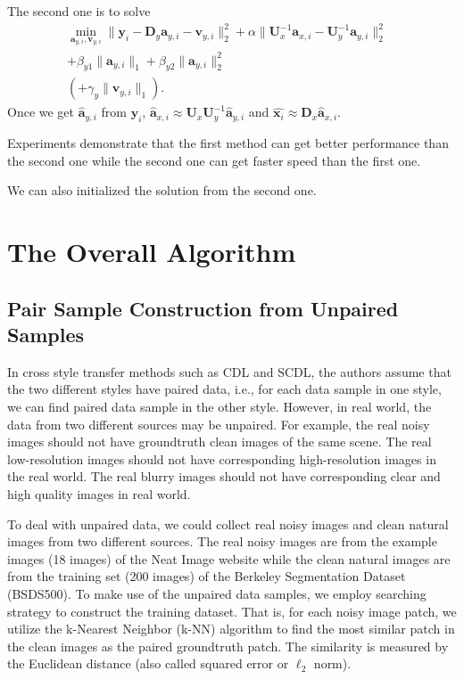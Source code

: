 \documentclass[10pt,twocolumn,letterpaper]{article}
\begin{document}
The second one is to solve
\begin{equation}
\begin{split}
\min_{\bm{a}_{y,i},\bm{v}_{y,i}}
\|\bm{y}_{i}-\bm{D}_{y}\bm{a}_{y,i}-\bm{v}_{y,i}\|_{2}^{2}
+
\alpha
\|\bm{U}_{x}^{-1}\bm{a}_{x,i}-\bm{U}_{y}^{-1}\bm{a}_{y,i}\|_{2}^{2}&
\\
+
\beta_{y1}\|\bm{a}_{y,i}\|_{1}
+
\beta_{y2}\|\bm{a}_{y,i}\|_{2}^{2}
&
\\
(+
\gamma_{y}\|\bm{v}_{y,i}\|_{1}).
\end{split}
\end{equation}
Once we get $\widehat{\bm{a}}_{y,i}$ from $\bm{y}_{i}$, $\widehat{\bm{a}}_{x,i}\approx\mathbf{U}_{x}\bm{U}_{y}^{-1}\widehat{\bm{a}}_{y,i}$ and $\widehat{\bm{x}_{i}}\approx\mathbf{D}_{x}\widehat{\bm{a}}_{x,i}$.

Experiments demonstrate that the first method can get better performance than the second one while the second one can get faster speed than the first one.

We can also initialized the solution from the second one. 

\section{The Overall Algorithm}

\subsection{Pair Sample Construction from Unpaired Samples}
In cross style transfer methods such as CDL and SCDL, the authors assume that the two different styles have paired data, i.e., for each data sample in one style, we can find paired data sample in the other style. However, in real world, the data from two different sources may be unpaired. For example, the real noisy images should not have groundtruth clean images of the same scene. The real low-resolution images should not have corresponding high-resolution images in the real world. The real blurry images should not have corresponding clear and high quality images in real world.

To deal with unpaired data, we could collect real noisy images and clean natural images from two different sources. The real noisy images are from the example images (18 images) of the Neat Image website while the clean natural images are from the training set (200 images) of the Berkeley Segmentation Dataset (BSDS500). To make use of the unpaired data samples, we employ searching strategy to construct the training dataset. That is, for each noisy image patch, we utilize the k-Nearest Neighbor (k-NN) algorithm to find the most similar patch in the clean images as the paired groundtruth patch. The similarity is measured by the Euclidean distance (also called squared error or $\ell_{2}$ norm).
\end{document}
